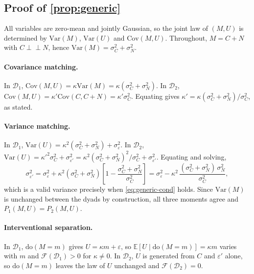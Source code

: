 \documentclass[11pt,a4paper]{article}
\theoremstyle{plain}
\theoremstyle{definition}
\theoremstyle{remark}
\newcommand{\Fc}{\mathcal{F}}
\newcommand{\Dy}{\mathcal{D}}
\newcommand{\dop}{\mathrm{do}}
\newcommand{\indep}{\perp\!\!\!\perp}
\newcommand{\Var}{\mathrm{Var}}
\newcommand{\Cov}{\mathrm{Cov}}
\newcommand{\Ex}{\mathbb{E}}
\begin{document}


\clearpage
\begin{appendices}

\section{Proof of \texorpdfstring{\cref{prop:generic}}{Proposition 2}}\label{app:proofs}

All variables are zero-mean and jointly Gaussian, so the joint law of $(M,U)$ is determined by
$\Var(M)$, $\Var(U)$ and $\Cov(M,U)$. Throughout, $M = C + N$ with $C \indep N$, hence
$\Var(M) = \sigma_C^2 + \sigma_N^2$.

\paragraph{Covariance matching.}
In $\Dy_1$, $\Cov(M,U) = \kappa \Var(M) = \kappa(\sigma_C^2 + \sigma_N^2)$. In $\Dy_2$,
$\Cov(M,U) = \kappa' \Cov(C, C+N) = \kappa' \sigma_C^2$. Equating gives
$\kappa' = \kappa(\sigma_C^2 + \sigma_N^2)/\sigma_C^2$, as stated.

\paragraph{Variance matching.}
In $\Dy_1$, $\Var(U) = \kappa^2(\sigma_C^2 + \sigma_N^2) + \sigma_\varepsilon^2$. In $\Dy_2$,
$\Var(U) = \kappa'^2 \sigma_C^2 + \sigma_{\varepsilon'}^2
= \kappa^2 (\sigma_C^2 + \sigma_N^2)^2/\sigma_C^2 + \sigma_{\varepsilon'}^2$. Equating and solving,
\[
\sigma_{\varepsilon'}^2
= \sigma_\varepsilon^2 + \kappa^2(\sigma_C^2+\sigma_N^2)\left[1 - \frac{\sigma_C^2+\sigma_N^2}{\sigma_C^2}\right]
= \sigma_\varepsilon^2 - \kappa^2\,\frac{(\sigma_C^2+\sigma_N^2)\,\sigma_N^2}{\sigma_C^2},
\]
which is a valid variance precisely when \eqref{eq:generic-cond} holds. Since $\Var(M)$ is unchanged
between the dyads by construction, all three moments agree and $P_1(M,U) = P_2(M,U)$.

\paragraph{Interventional separation.}
In $\Dy_1$, $\dop(M{=}m)$ gives $U = \kappa m + \varepsilon$, so $\Ex[U \mid \dop(M{=}m)] = \kappa m$
varies with $m$ and $\Fc(\Dy_1) > 0$ for $\kappa \neq 0$. In $\Dy_2$, $U$ is generated from $C$ and
$\varepsilon'$ alone, so $\dop(M{=}m)$ leaves the law of $U$ unchanged and $\Fc(\Dy_2) = 0$.


\end{appendices}
\end{document}
